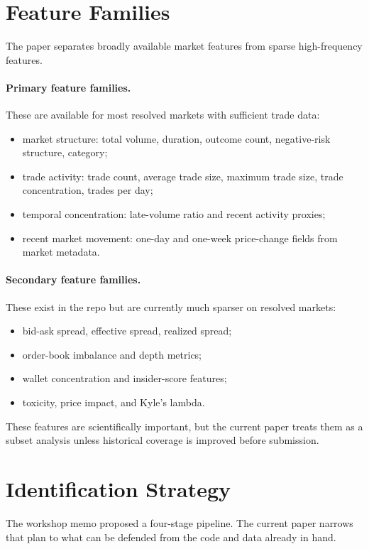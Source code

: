 \documentclass[10pt]{article}
\begin{document}
\section{Feature Families}

The paper separates broadly available market features from sparse high-frequency
features.

\paragraph{Primary feature families.}
These are available for most resolved markets with sufficient trade data:
\begin{itemize}[leftmargin=1.5em,itemsep=0.2em]
  \item market structure: total volume, duration, outcome count, negative-risk
  structure, category;
  \item trade activity: trade count, average trade size, maximum trade size,
  trade concentration, trades per day;
  \item temporal concentration: late-volume ratio and recent activity proxies;
  \item recent market movement: one-day and one-week price-change fields from
  market metadata.
\end{itemize}

\paragraph{Secondary feature families.}
These exist in the repo but are currently much sparser on resolved markets:
\begin{itemize}[leftmargin=1.5em,itemsep=0.2em]
  \item bid-ask spread, effective spread, realized spread;
  \item order-book imbalance and depth metrics;
  \item wallet concentration and insider-score features;
  \item toxicity, price impact, and Kyle's lambda.
\end{itemize}
These features are scientifically important, but the current paper treats them
as a subset analysis unless historical coverage is improved before submission.

\section{Identification Strategy}

The workshop memo proposed a four-stage pipeline. The current paper narrows that
plan to what can be defended from the code and data already in hand.
\end{document}
